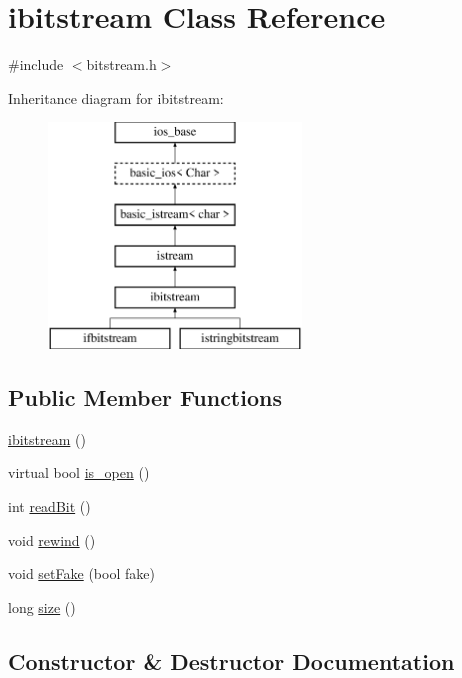 \hypertarget{classibitstream}{}\section{ibitstream Class Reference}
\label{classibitstream}


{\ttfamily \#include $<$bitstream.\+h$>$}

Inheritance diagram for ibitstream\+:\begin{figure}[H]
\begin{center}
\leavevmode
\includegraphics[height=6.000000cm]{classibitstream}
\end{center}
\end{figure}
\subsection*{Public Member Functions}
\begin{DoxyCompactItemize}
\item 
\mbox{\hyperlink{classibitstream_a72d1e7b784e2782d57a9ce3954a1f94f}{ibitstream}} ()
\item 
virtual bool \mbox{\hyperlink{classibitstream_a2f57f54d8c03b615bb31eee091d8a88a}{is\+\_\+open}} ()
\item 
int \mbox{\hyperlink{classibitstream_aa8c615fa7957fb0232a0873dadbd39e8}{read\+Bit}} ()
\item 
void \mbox{\hyperlink{classibitstream_ab8734e666421c9fe3b6380a818c6c727}{rewind}} ()
\item 
void \mbox{\hyperlink{classibitstream_ad916b4624eb09d375514964f867b475c}{set\+Fake}} (bool fake)
\item 
long \mbox{\hyperlink{classibitstream_a22727e9c338fb1aaa6722031445373c3}{size}} ()
\end{DoxyCompactItemize}


\subsection{Constructor \& Destructor Documentation}
\mbox{\label{classibitstream_a72d1e7b784e2782d57a9ce3954a1f94f}} 

